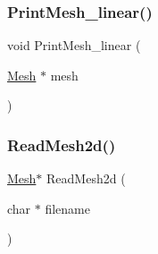 \mbox{\label{a00581_a0f8fa1f045215f1ea478f91156eb0317}} 
\subsubsection{\texorpdfstring{Print\+Mesh\+\_\+linear()}{PrintMesh\_linear()}}
{\footnotesize\ttfamily void Print\+Mesh\+\_\+linear (\begin{DoxyParamCaption}\item[{\hyperlink{a00557_aeffbe0891ab73a4d8964c9cb7978426e}{Mesh} $\ast$}]{mesh }\end{DoxyParamCaption})}

\mbox{\label{a00581_af31fd6654ededed596d98c090d8748b5}} 
\subsubsection{\texorpdfstring{Read\+Mesh2d()}{ReadMesh2d()}}
{\footnotesize\ttfamily \hyperlink{a00557_aeffbe0891ab73a4d8964c9cb7978426e}{Mesh}$\ast$ Read\+Mesh2d (\begin{DoxyParamCaption}\item[{char $\ast$}]{filename }\end{DoxyParamCaption})}

